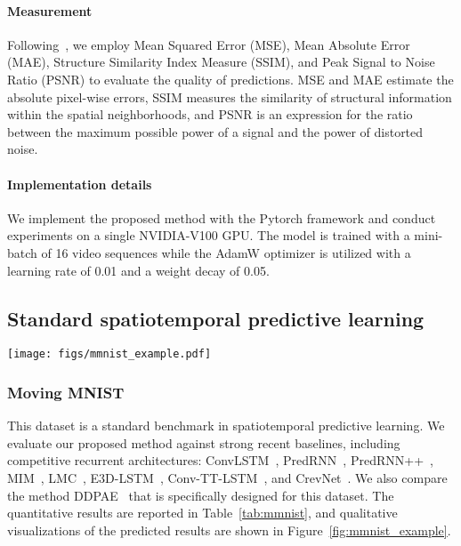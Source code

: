 \documentclass[10pt,twocolumn,letterpaper]{article}
\begin{document}
\paragraph{Measurement} Following~\cite{phydnet,crevnet}, we employ Mean Squared Error (MSE), Mean Absolute Error (MAE), Structure Similarity Index Measure (SSIM), and Peak Signal to Noise Ratio (PSNR) to evaluate the quality of predictions. MSE and MAE estimate the absolute pixel-wise errors, SSIM measures the similarity of structural information within the spatial neighborhoods, and PSNR is an expression for the ratio between the maximum possible power of a signal and the power of distorted noise.

\paragraph{Implementation details} We implement the proposed method with the Pytorch framework and conduct experiments on a single NVIDIA-V100 GPU. The model is trained with a mini-batch of 16 video sequences while the AdamW optimizer is utilized with a learning rate of 0.01 and a weight decay of 0.05.

\subsection{Standard spatiotemporal predictive learning}
\label{lab:standard}

\begin{figure*}[htbp]
\centering
\texttt{[image: figs/mmnist\_example.pdf]} 
\caption{Qualitative visualization of predicted results on Moving MNIST dataset. The differences between the ground truth and the predicted frames are visualized in the last row.}
\label{fig:mmnist_example} 
\end{figure*}

\subsubsection{Moving MNIST} This dataset is a standard benchmark in spatiotemporal predictive learning. We evaluate our proposed method against strong recent baselines, including competitive recurrent architectures: ConvLSTM~\cite{convlstm}, PredRNN~\cite{predrnn}, PredRNN++~\cite{predrnn++}, MIM~\cite{mim}, LMC~\cite{lee2021video}, E3D-LSTM~\cite{e3dlstm}, Conv-TT-LSTM~\cite{su2020convolutional}, and CrevNet~\cite{crevnet}. We also compare the method DDPAE~\cite{ddpae} that is specifically designed for this dataset. The quantitative results are reported in Table~\ref{tab:mmnist}, and qualitative visualizations of the predicted results are shown in Figure~\ref{fig:mmnist_example}. 
\end{document}
